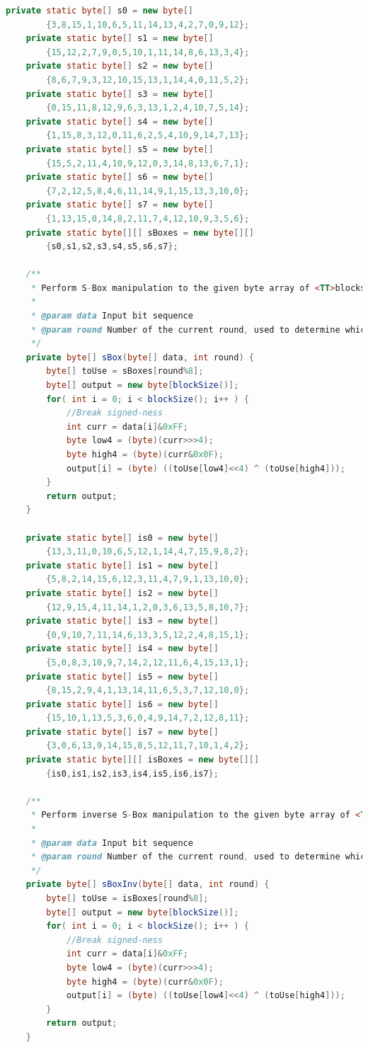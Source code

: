 \documentclass[12pt]{article} %
\begin{document}
\begin{lstlisting}[language=Java, basicstyle=\small, breaklines=true]
    private static byte[] s0 = new byte[]
        {3,8,15,1,10,6,5,11,14,13,4,2,7,0,9,12};
    private static byte[] s1 = new byte[]
        {15,12,2,7,9,0,5,10,1,11,14,8,6,13,3,4};
    private static byte[] s2 = new byte[]
        {8,6,7,9,3,12,10,15,13,1,14,4,0,11,5,2};
    private static byte[] s3 = new byte[]
        {0,15,11,8,12,9,6,3,13,1,2,4,10,7,5,14};
    private static byte[] s4 = new byte[]
        {1,15,8,3,12,0,11,6,2,5,4,10,9,14,7,13};
    private static byte[] s5 = new byte[]
        {15,5,2,11,4,10,9,12,0,3,14,8,13,6,7,1};
    private static byte[] s6 = new byte[]
        {7,2,12,5,8,4,6,11,14,9,1,15,13,3,10,0};
    private static byte[] s7 = new byte[]
        {1,13,15,0,14,8,2,11,7,4,12,10,9,3,5,6};
    private static byte[][] sBoxes = new byte[][]
        {s0,s1,s2,s3,s4,s5,s6,s7};

    /**
     * Perform S-Box manipulation to the given byte array of <TT>blocksize()</TT> length.
     *
     * @param data Input bit sequence
     * @param round Number of the current round, used to determine which S-Box to use.
     */
    private byte[] sBox(byte[] data, int round) {
        byte[] toUse = sBoxes[round%8];
        byte[] output = new byte[blockSize()];
        for( int i = 0; i < blockSize(); i++ ) {
            //Break signed-ness
            int curr = data[i]&0xFF;
            byte low4 = (byte)(curr>>>4);
            byte high4 = (byte)(curr&0x0F);
            output[i] = (byte) ((toUse[low4]<<4) ^ (toUse[high4]));
        }
        return output;
    }

    private static byte[] is0 = new byte[]
        {13,3,11,0,10,6,5,12,1,14,4,7,15,9,8,2};
    private static byte[] is1 = new byte[]
        {5,8,2,14,15,6,12,3,11,4,7,9,1,13,10,0};
    private static byte[] is2 = new byte[]
        {12,9,15,4,11,14,1,2,0,3,6,13,5,8,10,7};
    private static byte[] is3 = new byte[]
        {0,9,10,7,11,14,6,13,3,5,12,2,4,8,15,1};
    private static byte[] is4 = new byte[]
        {5,0,8,3,10,9,7,14,2,12,11,6,4,15,13,1};
    private static byte[] is5 = new byte[]
        {8,15,2,9,4,1,13,14,11,6,5,3,7,12,10,0};
    private static byte[] is6 = new byte[]
        {15,10,1,13,5,3,6,0,4,9,14,7,2,12,8,11};
    private static byte[] is7 = new byte[]
        {3,0,6,13,9,14,15,8,5,12,11,7,10,1,4,2};
    private static byte[][] isBoxes = new byte[][]
        {is0,is1,is2,is3,is4,is5,is6,is7};    

    /**
     * Perform inverse S-Box manipulation to the given byte array of <TT>blocksize()</TT> length.
     *
     * @param data Input bit sequence
     * @param round Number of the current round, used to determine which inverted S-Box to use.
     */
    private byte[] sBoxInv(byte[] data, int round) {
        byte[] toUse = isBoxes[round%8];
        byte[] output = new byte[blockSize()];
        for( int i = 0; i < blockSize(); i++ ) {
            //Break signed-ness
            int curr = data[i]&0xFF;
            byte low4 = (byte)(curr>>>4);
            byte high4 = (byte)(curr&0x0F);
            output[i] = (byte) ((toUse[low4]<<4) ^ (toUse[high4]));
        }
        return output;
    }


\end{lstlisting}
\end{document}
